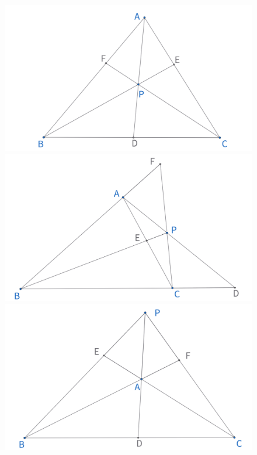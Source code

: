 \begin{figure}[H]
    \centering
    \begin{minipage}[t]{0.2\textwidth}
    \centering
    \includegraphics[width=\linewidth]{figures/ceva1.png}
    \end{minipage}
    \begin{minipage}[t]{0.2\textwidth}
    \centering
    \includegraphics[width=\linewidth]{figures/ceva2.png}
    \end{minipage}
    \begin{minipage}[t]{0.2\textwidth}
    \centering
    \includegraphics[width=\linewidth]{figures/ceva3.png}

\end{minipage}
\end{figure}
